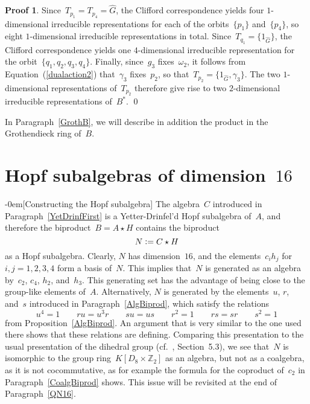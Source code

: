 \documentclass{article}
\makeatletter
\renewcommand{\subsection}{\@startsection{subsection}{2}{0em}%
{\baselineskip}{-0em}{\bfseries\normalsize}}
\numberwithin{equation}{section}
\theoremstyle{definition}
\newtheorem*{pf}{Proof}
\theoremstyle{break}
\newcommand{\deq}{\vcentcolon =}
\newcommand{\1}{{(1)}}
\newcommand{\2}{{(2)}}
\newcommand{\3}{{(3)}}
\newcommand{\Z}{{\mathbb Z}}
\makeatother
\begin{document}
\begin{pf}
Since~$T_{p_1} = T_{p_4} = \hat G$, the Clifford correspondence yields four $1$-dimensional irreducible representations for each of the orbits~$\{p_1\}$ and~$\{p_4\}$, so eight \mbox{$1$-dimen}\-sional irreducible representations in total. Since~$T_{q_1}= \{1_{\hat G}\}$, the Clifford correspondence yields one $4$-dimensional irreducible representation for the
orbit~$\{q_1, q_2, q_3, q_4\}$. Finally, since~$g_3$ fixes~$\omega_2$, it follows from Equation~(\ref{dualaction2}) that~$\gamma_3$ fixes~$p_2$, so
that~$T_{p_2} = \{1_{\hat G}, \gamma_3\}$. The two $1$-dimensional representations of~$T_{p_2}$ therefore give rise to two $2$-dimensional irreducible representations of~$B^*$.
\qed
\end{pf}

In Paragraph~\ref{GrothB}, we will describe in addition the product in the Grothendieck ring of~$B$.


\section{Hopf subalgebras of dimension~$16$} \label{Sec:2by16}
\subsection[Constructing the Hopf subalgebra]{} \label{N16}
The algebra~$C$ introduced in Paragraph~\ref{YetDrinfFirst} is a Yetter-Drinfel'd Hopf subalgebra of~$A$, and therefore the biproduct~$B = A \star H$ contains the biproduct
\[N \deq C \star H\]
as a Hopf subalgebra. Clearly, $N$ has dimension~$16$, and the elements~$c_i h_j$ for~$i,j = 1,2,3,4$ form a basis of~$N$. This implies that~$N$ is generated as an algebra by~$c_2$, $c_4$, $h_2$, and~$h_3$. This generating set has the advantage of being close to the group-like elements of~$A$. Alternatively, $N$ is generated by the elements~$u$, $r$, and~$s$ introduced in Paragraph~\ref{AlgBiprod}, which satisfy the relations
\[u^4 = 1 \qquad r u = u^3 r \qquad s u = u s \qquad r^2 = 1 \qquad rs = sr \qquad s^2 = 1 \]
from Proposition~\ref{AlgBiprod}. An argument that is very similar to the one used there shows that these relations are defining. Comparing this presentation to the usual presentation of the dihedral group (cf.~\cite{SerRep}, Section~5.3), we see that~$N$ is isomorphic to the
group ring~$K[D_8 \times \Z_2]$ as an algebra, but not as a coalgebra, as it is not cocommutative, as for example the formula for the coproduct of~$c_2$ in Paragraph~\ref{CoalgBiprod} shows. This issue will be revisited at the end of Paragraph~\ref{QN16}.
\end{document}
